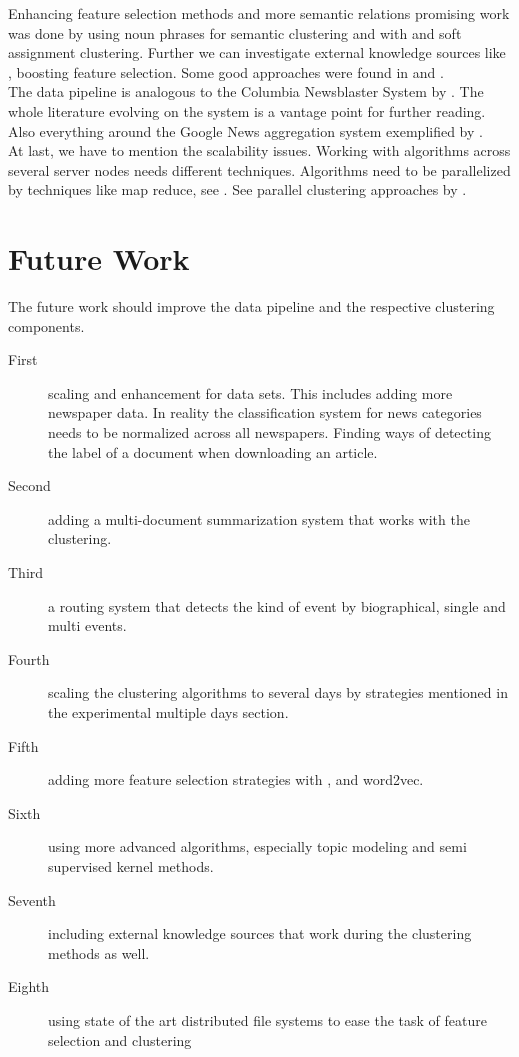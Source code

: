 Enhancing feature selection methods and more semantic relations promising work was done by \cite{NounPhraseSemanticClustering2009} using noun phrases for semantic clustering and 
\cite{WordNetAndFuzzyAssociation2010} with \wordnet{} and soft assignment clustering. Further we can investigate external knowledge sources like \wiki{}, boosting feature selection. Some good approaches were found in \cite{WikipediaClusteringSim2009} and \cite{WikipediaClustering2010}.\\

The data pipeline is analogous to the Columbia Newsblaster System by \cite{NewsBlaster2002}. The whole literature evolving on the system is a vantage point for further reading. Also everything around the Google News aggregation system exemplified by \cite{GoogleNews2007}.\\

At last, we have to mention the scalability issues. Working with algorithms across several server nodes needs different techniques. Algorithms need to be parallelized by techniques like map reduce, see \cite{MapReduce2008}. See parallel clustering approaches by \cite{ParallelClustering2009}.

\section{Future Work}
\label{sec:future_work}
The future work should improve the data pipeline and the respective clustering components.

\begin{description}
  \item[First] scaling and enhancement for data sets. This includes adding more newspaper data. In reality the classification system for news categories needs to be normalized across all newspapers. Finding ways of detecting the label of a document when downloading an article.
  \item[Second] adding a multi-document summarization system that works with the clustering.
  \item[Third] a routing system that detects the kind of event by biographical, single and multi events.
  \item[Fourth] scaling the clustering algorithms to several days by strategies mentioned in the experimental multiple days section.
  \item[Fifth] adding more feature selection strategies with \wordnet{}, \wiki{} and word2vec.
  \item[Sixth] using more advanced algorithms, especially topic modeling and semi supervised kernel methods.
  \item[Seventh] including external knowledge sources that work during the clustering methods as well.
  \item[Eighth] using state of the art distributed file systems to ease the task of feature selection and clustering
\end{description}

